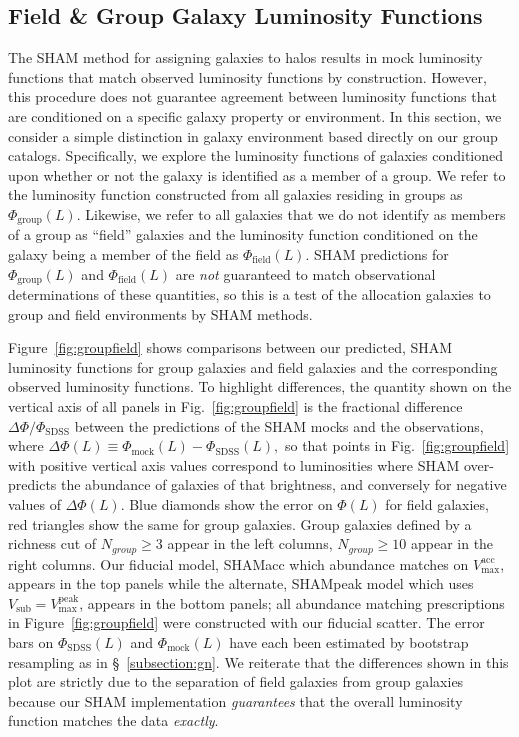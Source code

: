 \documentclass[usenatbib,usegraphicx,letterpaper]{mn2e}
\newcommand{\vpeak}{V_{\mathrm{max}}^{\mathrm{peak}}}
\newcommand{\vacc}{V_{\mathrm{max}}^{\mathrm{acc}}}
\newcommand{\vsub}{V_{\mathrm{sub}}}
\begin{document}
\subsection{Field \& Group Galaxy Luminosity Functions}
\label{subsection:groupfield}

The SHAM method for assigning galaxies to halos results in mock luminosity 
functions that match observed luminosity functions by construction.  However, 
this procedure does not guarantee agreement between luminosity functions 
that are conditioned on a specific galaxy property or environment.  In this 
section, we consider a simple distinction in galaxy environment based directly 
on our group catalogs.  Specifically, we explore the luminosity functions of galaxies 
conditioned upon whether or not the galaxy is identified as a member of a group. 
We refer to the luminosity function constructed from all galaxies residing in 
groups as $\Phi_{\mathrm{group}}(L)$.  
Likewise, we refer to all galaxies that we do not identify as members of a 
group as ``field'' galaxies and the luminosity function conditioned on the 
galaxy being a member of the field as $\Phi_{\mathrm{field}}(L)$.  
SHAM predictions for $\Phi_{\mathrm{group}}(L)$ and $\Phi_{\mathrm{field}}(L)$ are 
{\em not} guaranteed to match observational determinations of these quantities, so 
this is a test of the allocation galaxies to group and field environments 
by SHAM methods.


Figure~\ref{fig:groupfield} shows comparisons between our predicted, SHAM luminosity 
functions for group galaxies and field galaxies and the corresponding 
observed luminosity functions.  To highlight differences, the quantity 
shown on the vertical axis of all panels in Fig.~\ref{fig:groupfield} is the 
fractional difference $\Delta\Phi/\Phi_{\mathrm{SDSS}}$ between the predictions of the 
SHAM mocks and the observations, 
where $\Delta\Phi(L) \equiv \Phi_{\mathrm{mock}}(L)-\Phi_{\mathrm{SDSS}}(L),$ 
so that points in Fig.~\ref{fig:groupfield} with positive vertical axis values 
correspond to luminosities where SHAM over-predicts the abundance of galaxies of that 
brightness, and conversely for negative values of $\Delta\Phi(L)$.  
Blue diamonds show the error on $\Phi(L)$ for field galaxies, red triangles show the same 
for group galaxies. Group galaxies defined by a richness cut of 
$N_{group} \geq 3$ appear in the left columns, $N_{group}\geq 10$ appear in the 
right columns. Our fiducial model, SHAMacc which abundance matches on $\vacc$, 
appears in the top panels while the alternate, SHAMpeak model which uses $\vsub=\vpeak$, 
appears in the bottom panels; all abundance matching prescriptions in 
Figure~\ref{fig:groupfield} were constructed with our fiducial scatter. 
The error bars on $\Phi_{\mathrm{SDSS}}(L)$ and $\Phi_{\mathrm{mock}}(L)$ have each been 
estimated by bootstrap resampling as in \S~\ref{subsection:gn}. 
We reiterate that the differences shown in this plot are strictly due to 
the separation of field galaxies from group galaxies because our SHAM 
implementation {\em guarantees} that the overall luminosity function matches 
the data {\em exactly}.  
\end{document}

